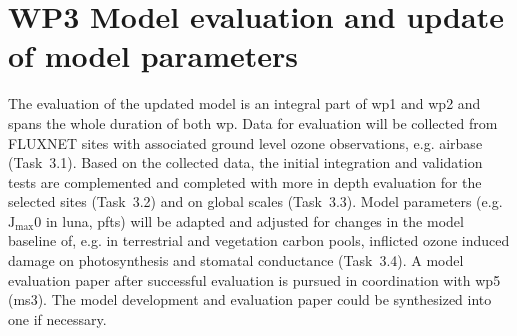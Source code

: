 \section{WP3 Model evaluation and update of model parameters}
\label{sec:wp3}
The evaluation of the updated model is an integral part of \gls{wp}1 and \gls{wp}2 and spans the whole duration of both \gls{wp}. Data for evaluation will be collected from FLUXNET sites with associated ground level ozone observations, e.g. \gls{airbase} (Task~3.1). Based on the collected data, the initial integration and validation tests are complemented and completed with more in depth evaluation for the selected sites (Task~3.2) and on global scales (Task~3.3). Model parameters  (e.g. $\mathrm{J_{max}}$0 in \gls{luna}, \glspl{pft}) will be adapted and adjusted for changes in the model baseline of, e.g. in terrestrial and vegetation carbon pools, inflicted ozone induced damage on photosynthesis and stomatal conductance (Task~3.4). A model evaluation paper after successful evaluation is pursued in coordination with \gls{wp}5 (\gls{ms}3). The model development and evaluation paper could be synthesized into one if necessary.

